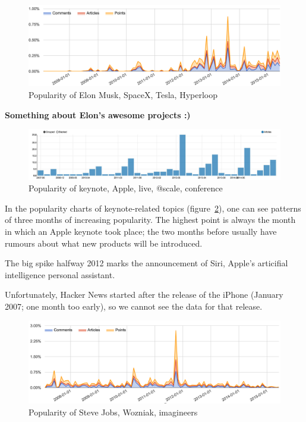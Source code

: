 \begin{figure}[H] %
	\caption{Popularity of Elon Musk, SpaceX, Tesla, Hyperloop}
	\label{fig:trend_elon}
	\centering
	\includegraphics[width=14cm]{topic_trends/elon_relative}
\end{figure}
\textbf{Something about Elon's awesome projects :)}

\begin{figure}[H] %
	\caption{Popularity of keynote, Apple, live, @scale, conference}
	\label{fig:trend_keynote}
	\centering
	\includegraphics[width=14cm]{topic_trends/keynote}
\end{figure}
In the popularity charts of keynote-related topics (figure~\ref{fig:trend_keynote}), one can see patterns of three months of increasing popularity. The highest point is always the month in which an Apple keynote took place; the two months before usually have rumours about what new products will be introduced.

The big spike halfway 2012 marks the announcement of Siri, Apple's articifial intelligence personal assistant.

Unfortunately, Hacker News started after the release of the iPhone (January 2007; one month too early), so we cannot see the data for that release.

\begin{figure}[H] %
	\caption{Popularity of Steve Jobs, Wozniak, imagineers}
	\label{fig:trend_jobs}
	\centering
	\includegraphics[width=14cm]{topic_trends/jobs_relative}
\end{figure}

